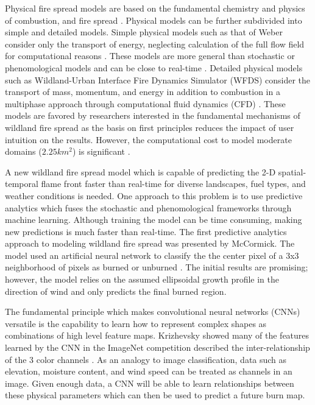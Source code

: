 \documentclass[smallcondensed]{svjour3}     %
\begin{document}
Physical fire spread models are based on the fundamental chemistry and physics of
combustion, and fire spread \cite{sullivan2007a}. Physical models can be further 
subdivided into simple and detailed models. Simple physical models such as that of
Weber consider only the transport of energy, neglecting calculation of the full
flow field for computational reasons \cite{weber1991modelling}. These models
are more general than stochastic or phenomological models and can be close to
real-time \cite{simeoni2015wildland}. Detailed physical models such as
Wildland-Urban Interface Fire Dynamics Simulator (WFDS) consider the transport of
mass, momentum, and energy in addition to combustion in a multiphase approach
through computational fluid dynamics (CFD) \cite{mell2007physics}. These models
are favored by researchers interested in the fundamental mechanisms of wildland
fire spread as the basis on first principles reduces the impact of user intuition
on the results. However, the computational cost to model moderate domains
($2.25km^{2}$) is significant \cite{mell2007physics}.

A new wildland fire spread model which is capable of predicting the 2-D
spatial-temporal flame front faster than real-time for diverse landscapes,
fuel types, and weather conditions is needed. One approach to this problem
is to use predictive analytics which fuses the stochastic and
phenomological frameworks through machine learning.
Although training the model can be time consuming, making new predictions
is much faster than real-time.
The first predictive analytics approach to modeling wildland fire spread was
presented by McCormick. The model used an artificial neural network to classify
the the center pixel of a 3x3 neighborhood of pixels as burned or unburned
\cite{mccormick2001toward,mccormick2002developing}.
The initial results are promising; however, the model relies on the assumed
ellipsoidal growth profile in the direction of wind
\cite{finney1999mechanistic} and only predicts the final burned region.

The fundamental principle which makes convolutional neural networks (CNNs)
versatile is the capability to learn how to represent complex
shapes as combinations of high level feature maps. Krizhevsky showed
many of the features learned by the CNN in the ImageNet competition
described the inter-relationship of the 3 color channels \cite{krizhevsky2012imagenet}.
As an analogy to image classification, data such as elevation, moisture content, and 
wind speed can be treated as channels in an image. Given enough data, a CNN will be
able to learn relationships between these physical parameters which can then be used
to predict a future burn map. 
\end{document}
